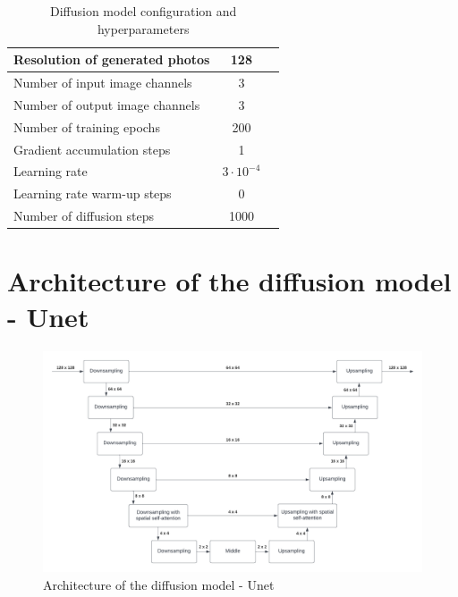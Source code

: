 \documentclass[runningheads]{llncs}
\begin{document}
\begin{table}[H]\footnotesize
  \centering
  \caption{Diffusion model configuration and hyperparameters}    %
  {\begin{tabular}{|l|c|c|} 
        \hline
        Resolution of generated photos & 128 \\
        \hline
        Number of input image channels & 3 \\
        \hline
        Number of output image channels & 3 \\
        \hline
        Number of training epochs & 200 \\
        \hline
        Gradient accumulation steps & 1 \\
        \hline
        Learning rate & $3 \cdot 10^{-4}$ \\
        \hline
        Learning rate warm-up steps & 0 \\
        \hline
        Number of diffusion steps & 1000 \\
        \hline
  \end{tabular}}
  \label{tab:Diffuser hyperparameters}
\end{table}

\section{Architecture of the diffusion model - Unet}
\label{app:diffuser_scheme}

\begin{figure}[H]
    \centering
    \includegraphics[scale=0.22]{img/Diffuser-unet.png}
    \caption{Architecture of the diffusion model - Unet}   %
    \label{img:diffuser_scheme}
\end{figure}
\end{document}
